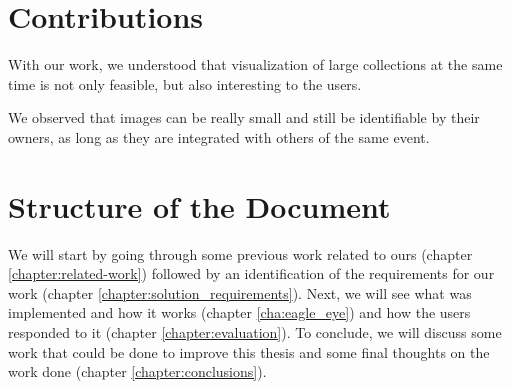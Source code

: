 



\section{Contributions} %
\label{sec:contributions}

With our work, we understood that visualization of large collections at the same time is not only feasible, but also interesting to the users. 

We observed that images can be really small and still be identifiable by their owners, as long as they are integrated with others of the same event.




\section{Structure of the Document} %
\label{ssub:structure_of_the_document}

We will start by going through some previous work related to ours (chapter \ref{chapter:related-work}) followed by an identification of the requirements for our work (chapter \ref{chapter:solution_requirements}). Next, we will see what was implemented and how it works (chapter \ref{cha:eagle_eye}) and how the users responded to it (chapter \ref{chapter:evaluation}). To conclude, we will discuss some work that could be done to improve this thesis and some final thoughts on the work done (chapter \ref{chapter:conclusions}).



